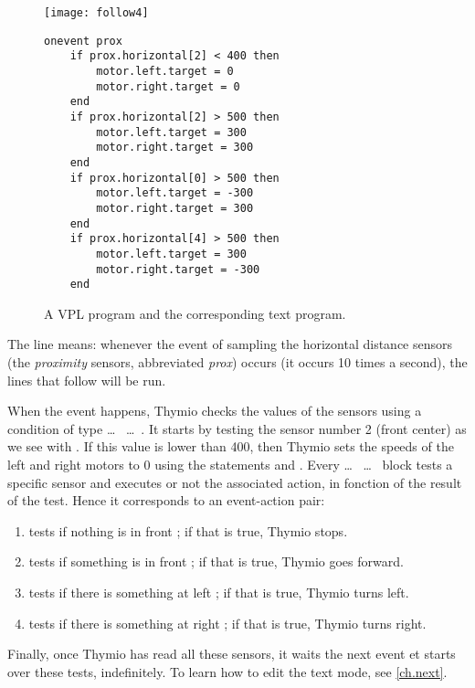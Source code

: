 \begin{figure}
\texttt{[image: follow4]}
\hfill
\begin{minipage}[b]{0.6\textwidth}
\footnotesize
\begin{lstlisting}
onevent prox
	if prox.horizontal[2] < 400 then
		motor.left.target = 0
		motor.right.target = 0
	end
	if prox.horizontal[2] > 500 then
		motor.left.target = 300
		motor.right.target = 300
	end
	if prox.horizontal[0] > 500 then
		motor.left.target = -300
		motor.right.target = 300
	end
	if prox.horizontal[4] > 500 then
		motor.left.target = 300
		motor.right.target = -300
	end
\end{lstlisting}
\end{minipage}
\caption{A VPL program and the corresponding text program.}
\label{fig.textcode}
\end{figure}

The line  means: whenever the event of sampling the
horizontal distance sensors (the \emph{proximity} sensors, abbreviated \emph{prox}) occurs (it
occurs 10 times a second), the lines that follow will be run.

When the event happens, Thymio checks the values of the sensors using a condition of type  \ldots \  \ldots \ .
It starts by testing the sensor number 2 (front center) as we see with .
If this value is lower than 400, then Thymio sets the speeds of the left and right motors to 0 using the statements  and .
Every  \ldots \  \ldots \  block tests a specific sensor and executes or not the associated action, in fonction of the result of the test.
Hence it corresponds to an event-action pair:
\begin{enumerate}[start=0,noitemsep,nosep]
	\item tests if nothing is in front ; if that is true, Thymio stops.
	\item tests if something is in front ; if that is true, Thymio goes forward.
	\item tests if there is something at left ; if that is true, Thymio turns left.
	\item tests if there is something at right ; if that is true, Thymio turns right.
\end{enumerate}
Finally, once Thymio has read all these sensors, it waits the next event  et starts over these tests, indefinitely.
To learn how to edit the text mode, see \cref{ch.next}.

